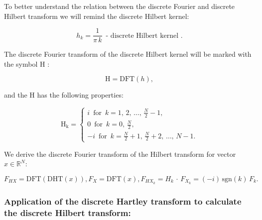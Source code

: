 \documentclass[12pt,twoside,a4paper]{article}
\numberwithin{equation}{subsection}
\numberwithin{figure}{subsection}
\begin{document}
To better understand the relation between the discrete Fourier and discrete Hilbert transform we will remind the discrete Hilbert kernel:

\begin{equation}   \label{eq:hdfttps_smallh}
	h_k = \frac {1}{\pi \, k} \, \mbox{ - discrete Hilbert kernel } .  
\end{equation}

The discrete Fourier transform of the discrete Hilbert kernel will be marked with the symbol $\mathrm{H}$ :

\begin{equation}   \label{eq:hdfttps_bigh}
    \mathrm{H} = \mathrm{DFT}(h), 
\end{equation}

and the $\mathrm{H}$ has the following properties:

\begin{subequations} \label{eq:hartley_defh}
  \begin{equation}   \label{eq:hdefh_fhalf}
    \mathrm{H_k} =  
    \begin{cases}
    	i  \, \mbox{ for } \, k = 1, \, 2, \, \ldots, \, \frac {N}{2} - 1 , \\
    	0  \, \mbox{ for } \, k = 0, \, \frac {N}{2} , \\
    	-i \, \mbox{ for } \, k = \frac {N}{2} + 1, \, \frac {N}{2} + 2, \, \ldots, \, N - 1 .
    \end{cases}
  \end{equation} 
\end{subequations}

We derive the discrete Fourier transform of the Hilbert transform for vector $x \in \mathbb{R} ^ N$:

\begin{subequations} \label{eq:hartley_dfttheorem}
	\begin{equation}
		F_{HX} = \mathrm{DFT} \left(\mathrm{DHT} (x) \right) ,
	\end{equation}
	\begin{equation}
		F_{X} = \mathrm{DFT} (x) ,
	\end{equation}
	\begin{equation} 
	    F_{HX_k} = H_k \, \cdot \, F_{X_k} = ( - i) \, \mathrm{\text{sgn}}(k) \, F_k .
	\end{equation}
\end{subequations}
\subsubsection*{Application of the discrete Hartley transform to calculate the discrete Hilbert transform:}
\end{document}
